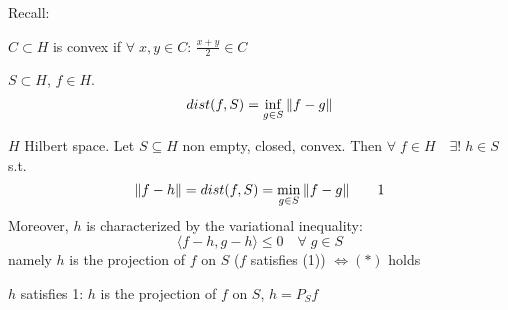 Recall:
\begin{definition}
    \(C \subset H \) is convex if \(\forall\; x, y \in C: \, \frac{x+y}{2} \in C\)
\end{definition}
\begin{definition}
    \(S \subset H\), \(f \in H\). \[ dist (f, S) = \inf_{g \in S} \norm{f-g}\]
\end{definition}

\begin{theorem}
    \(H\) Hilbert space. Let \(S \subseteq H\) non empty, closed, convex. Then \(\forall \; f \in H \quad \exists! \; h \in S\) s.t. 
    \[
        \norm{f-h} = dist (f, S) = \min_{g \in S} \norm{f-g} \tag*{1}
    \]
    Moreover, \(h\) is characterized by the variational inequality:
    \[
        \langle f-h, g-h \rangle \leq 0 \quad \forall \; g \in S \tag*{*}
    \]
    namely \(h\) is the projection of \(f \) on \(S\) (\(f\) satisfies (1)) \(\Leftrightarrow (*) \) holds
\end{theorem}
\begin{remark}
    \(h\) satisfies 1: \(h\) is the projection of \(f\) on \(S\), \(h = P_S f\)
\end{remark}
